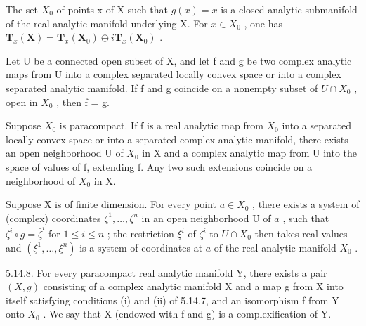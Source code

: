 The set \(X_{0}\) of points x of X such that \(g(x) = x\) is a closed analytic submanifold of the real analytic manifold underlying X. For \(x \in X_{0}\) , one has \(\mathbf{T}_{x}(\mathbf{X}) = \mathbf{T}_{x}(\mathbf{X}_{0}) \oplus i\mathbf{T}_{x}(\mathbf{X}_{0})\) .

Let U be a connected open subset of X, and let f and g be two complex analytic maps from U into a complex separated locally convex space or into a complex separated analytic manifold. If f and g coincide on a nonempty subset of \(U \cap X_{0}\) , open in \(X_{0}\) , then f = g.

Suppose \(X_{0}\) is paracompact. If f is a real analytic map from \(X_{0}\) into a separated locally convex space or into a separated complex analytic manifold, there exists an open neighborhood U of \(X_{0}\) in X and a complex analytic map from U into the space of values of f, extending f. Any two such extensions coincide on a neighborhood of \(X_{0}\) in X.

Suppose X is of finite dimension. For every point \(a \in X_{0}\) , there exists a system of (complex) coordinates \(\zeta^{1}, \ldots, \zeta^{n}\) in an open neighborhood U of \(a\) , such that \(\zeta^{i} \circ g = \bar{\zeta}^{i}\) for \(1 \leqslant i \leqslant n\) ; the restriction \(\xi^{i}\) of \(\zeta^{i}\) to \(U \cap X_{0}\) then takes real values and \((\xi^{1}, \ldots, \xi^{n})\) is a system of coordinates at \(a\) of the real analytic manifold \(X_{0}\) .

5.14.8. For every paracompact real analytic manifold Y, there exists a pair \((X, g)\) consisting of a complex analytic manifold X and a map g from X into itself satisfying conditions (i) and (ii) of 5.14.7, and an isomorphism f from Y onto \(X_{0}\) . We say that X (endowed with f and g) is a complexification of Y.

